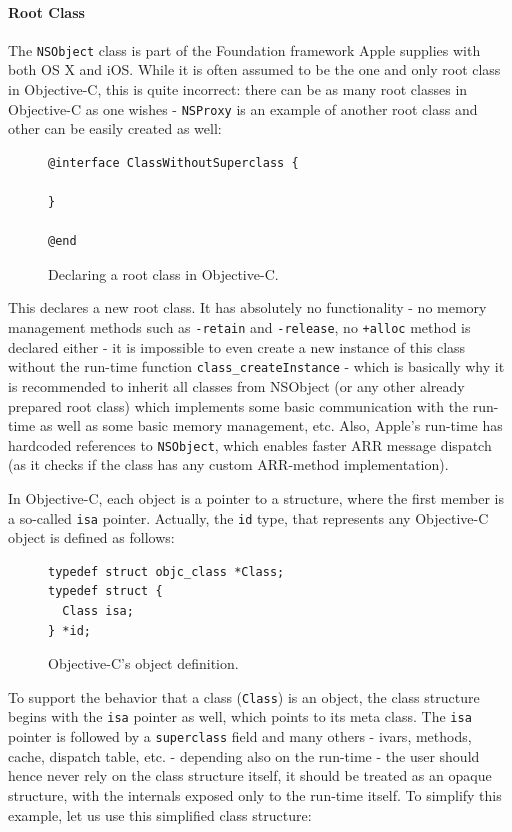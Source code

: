 \paragraph{Root Class}
The \verb=NSObject= class is part of the Foundation framework Apple supplies with both OS X and iOS. While it is often assumed to be the one and only root class in Objective-C, this is quite incorrect: there can be as many root classes in Objective-C as one wishes - \verb=NSProxy= is an example of another root class and other can be easily created as well:

\begin{figure}[H]
\begin{verbatim}@interface ClassWithoutSuperclass {
  
}

@end\end{verbatim}
  \centering{}
  \caption{Declaring a root class in Objective-C.}
  \label{fig:objc_root_class}
\end{figure}

This declares a new root class. It has absolutely no functionality - no memory management methods such as \verb=-retain= and \verb=-release=, no \verb=+alloc= method is declared either - it is impossible to even create a new instance of this class without the run-time function \verb=class_createInstance= - which is basically why it is recommended to inherit all classes from NSObject (or any other already prepared root class) which implements some basic communication with the run-time as well as some basic memory management, etc. Also, Apple's run-time has hardcoded references to \verb=NSObject=, which enables faster ARR message dispatch (as it checks if the class has any custom ARR-method implementation).

In Objective-C, each object is a pointer to a structure, where the first member is a so-called \verb=isa= pointer. Actually, the \verb=id= type, that represents any Objective-C object is defined as follows:

\begin{figure}[H]
\begin{verbatim}
typedef struct objc_class *Class;
typedef struct {
  Class isa;
} *id;
\end{verbatim}
  \centering{}
  \caption{Objective-C's object definition.}
  \label{fig:objc_obj_def}
\end{figure}

To support the behavior that a class (\verb=Class=) is an object, the class structure begins with the \verb=isa= pointer as well, which points to its meta class. The \verb=isa= pointer is followed by a \verb=superclass= field and many others - ivars, methods, cache, dispatch table, etc. - depending also on the run-time - the user should hence never rely on the class structure itself, it should be treated as an opaque structure, with the internals exposed only to the run-time itself. To simplify this example, let us use this simplified class structure:

